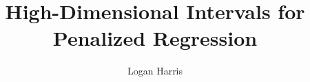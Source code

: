 

\abtitlepgtrue
\abstractpgtrue
\titlepgtrue
\copyrighttrue %
\acktrue %
\tablecontentstrue
\tablespagetrue
\figurespagetrue
\prefacetrue

\newcommand{\prefacetext}{
The core of this thesis contains three papers which are intended to serve as stand alone publications. As such, there are redundancies in some content particularly in introduction sections or where a previous concept introduced in an earlier Chapter is vital for setting the ground work of a later Chpater. 
}

\title{High-Dimensional Intervals for Penalized Regression}
\author{Logan Harris}

